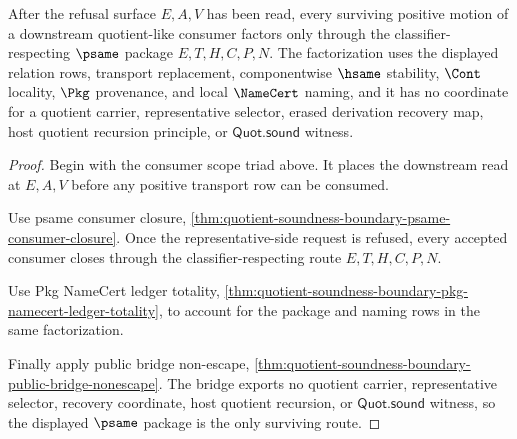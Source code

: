 \begin{theorem}
\label{thm:quotient-soundness-boundary-psame-consumer-factorization}
After the refusal surface $E,A,V$ has been read, every surviving positive motion of a downstream quotient-like consumer factors only through the classifier-respecting $\psame$ package $E,T,H,C,P,N$. The factorization uses the displayed relation rows, transport replacement, componentwise $\hsame$ stability, $\Cont$ locality, $\Pkg$ provenance, and local $\NameCert$ naming, and it has no coordinate for a quotient carrier, representative selector, erased derivation recovery map, host quotient recursion principle, or $\mathsf{Quot.sound}$ witness.
\end{theorem}
\begin{proof}
Begin with the consumer scope triad above. It places the downstream read at $E,A,V$ before any positive transport row can be consumed.

Use psame consumer closure, \autoref{thm:quotient-soundness-boundary-psame-consumer-closure}. Once the representative-side request is refused, every accepted consumer closes through the classifier-respecting route $E,T,H,C,P,N$.

Use Pkg NameCert ledger totality, \autoref{thm:quotient-soundness-boundary-pkg-namecert-ledger-totality}, to account for the package and naming rows in the same factorization.

Finally apply public bridge non-escape, \autoref{thm:quotient-soundness-boundary-public-bridge-nonescape}. The bridge exports no quotient carrier, representative selector, recovery coordinate, host quotient recursion, or $\mathsf{Quot.sound}$ witness, so the displayed $\psame$ package is the only surviving route.
\end{proof}

